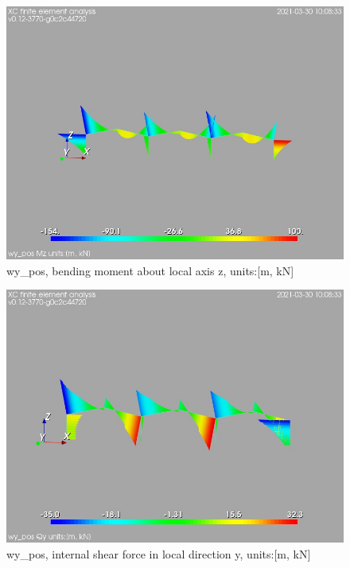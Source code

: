 \begin{figure}
\begin{center}
\includegraphics[width=\linewidth]{calc_results/sole_zeinali/text/graphics/resSimplLC/wy_posallMemberSetMz}
\caption{wy_pos, bending moment about local axis z, units:[m, kN]}
\end{center}
\end{figure}
\begin{figure}
\begin{center}
\includegraphics[width=\linewidth]{calc_results/sole_zeinali/text/graphics/resSimplLC/wy_posallMemberSetQy}
\caption{wy_pos, internal shear force in local direction y, units:[m, kN]}
\end{center}
\end{figure}
